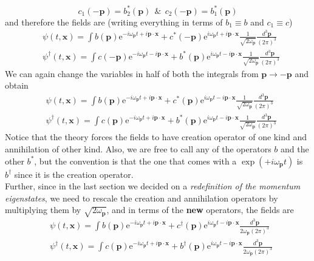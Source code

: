 \documentclass[11pt]{article}
\newcommand{\e}{\mathrm{e}}
\newcommand{\w}{\omega}
\numberwithin{equation}{section}
\begin{document}
{        \begin{equation*}
          c_1(-\textbf{p}) = b_2^*(\textbf{p})~~\&~~ c_2(-\textbf{p}) = b_1^*(\textbf{p})
        \end{equation*}
        and therefore the fields are (writing everything in terms of \(b_1\equiv b\) and \(c_1\equiv c\))
        \begin{align*}
            &\psi(t, \textbf{x}) = \int b(\textbf{p}) \e^{-i\w_\textbf{p}t + i\textbf{p}\cdot \textbf{x}} + c^*(-\textbf{p})\e^{i\w_\textbf{p}t + i\textbf{p}\cdot \textbf{x}} \frac{1}{\sqrt{2\w_\textbf{p}}}\frac{d^3\textbf{p}}{(2\pi)^3}\\
            &\psi^\dagger(t, \textbf{x}) = \int c(-\textbf{p}) \e^{-i\w_\textbf{p}t - i\textbf{p}\cdot \textbf{x}} + b^*(\textbf{p})\e^{i\w_\textbf{p}t - i\textbf{p}\cdot \textbf{x}} \frac{1}{\sqrt{2\w_\textbf{p}}}\frac{d^3\textbf{p}}{(2\pi)^3}
        \end{align*}
        We can again change the variables in half of both the integrals from \(\textbf{p}\to-\textbf{p}\) and obtain 
        \begin{align*}
            &\psi(t, \textbf{x}) = \int b(\textbf{p}) \e^{-i\w_\textbf{p}t + i\textbf{p}\cdot \textbf{x}} + c^*(\textbf{p})\e^{i\w_\textbf{p}t - i\textbf{p}\cdot \textbf{x}} \frac{1}{\sqrt{2\w_\textbf{p}}}\frac{d^3\textbf{p}}{(2\pi)^3}\\
            &\psi^\dagger(t, \textbf{x}) = \int c(\textbf{p}) \e^{-i\w_\textbf{p}t + i\textbf{p}\cdot \textbf{x}} + b^*(\textbf{p})\e^{i\w_\textbf{p}t - i\textbf{p}\cdot \textbf{x}} \frac{1}{\sqrt{2\w_\textbf{p}}}\frac{d^3\textbf{p}}{(2\pi)^3}
        \end{align*}
        Notice that the theory forces the fields to have creation operator of one kind and annihilation of other kind. Also, we are free to call any of the operators \(b\) and the other \(b^*\), but the convention is that the one that comes with a \(\exp(+i\w_\textbf{p} t)\) is \(b^\dagger\) since it is the creation operator.\vspace{7pt}\\
        Further, since in the last section we decided on a \textit{redefinition of the momentum eigenstates}, we need to rescale the creation and annihilation operators by multiplying them by \(\sqrt{2\w_\textbf{p}}\), and in terms of the \textbf{new} operators, the fields are 
        \begin{align*}
            &\psi(t, \textbf{x}) = \int b(\textbf{p}) \e^{-i\w_\textbf{p}t + i\textbf{p}\cdot \textbf{x}} + c^\dagger(\textbf{p})\e^{i\w_\textbf{p}t - i\textbf{p}\cdot \textbf{x}} \frac{d^3\textbf{p}}{2\w_\textbf{p}(2\pi)^3}\\
            &\psi^\dagger(t, \textbf{x}) = \int c(\textbf{p}) \e^{-i\w_\textbf{p}t + i\textbf{p}\cdot \textbf{x}} + b^\dagger(\textbf{p})\e^{i\w_\textbf{p}t - i\textbf{p}\cdot \textbf{x}} \frac{d^3\textbf{p}}{2\w_\textbf{p}(2\pi)^3}
        \end{align*}
    }
\end{document}
